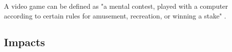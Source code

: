 \documentclass[a4paper,11.5pt]{report}
\numberwithin{figure}{section}
\numberwithin{table}{section}
\numberwithin{equation}{section}
\numberwithin{equation}{section}
\begin{document}
A video game can be defined as "a mental contest, played with a computer according to certain rules for amusement, recreation, or winning a stake" \citep{Zyda2005}.







\subsection{Impacts}
\end{document}
